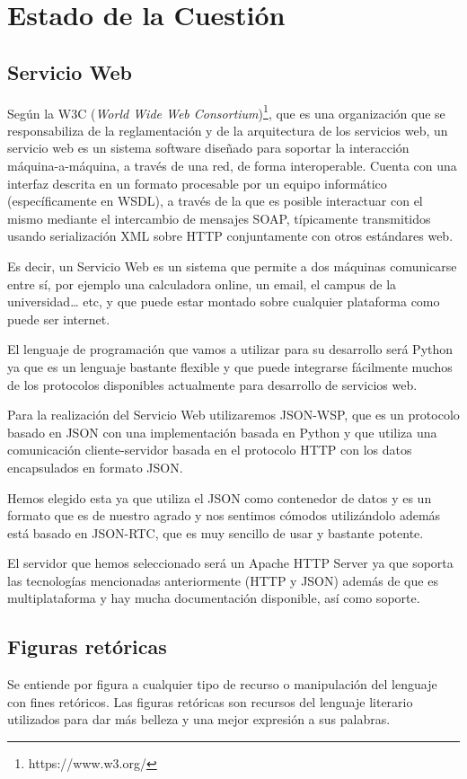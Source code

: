 \chapter{Estado de la Cuestión}
\label{cap:estadoDeLaCuestion}


\section{Servicio Web}
Según la W3C (\textit{World Wide Web Consortium})\footnote{https://www.w3.org/}, que es una organización que se responsabiliza de la reglamentación y de la arquitectura de los servicios web, un servicio web es un sistema software diseñado para soportar la interacción máquina-a-máquina, a través de una red, de forma interoperable.  Cuenta con una interfaz descrita en un formato procesable por un equipo informático (específicamente en WSDL), a través de la que es posible interactuar con el mismo mediante el intercambio de mensajes SOAP, típicamente transmitidos usando serialización XML sobre HTTP conjuntamente con otros estándares web.

Es decir, un Servicio Web es un sistema que permite a dos máquinas comunicarse entre sí, por ejemplo una calculadora online, un email, el campus de la universidad… etc, y que puede estar montado sobre cualquier plataforma como puede ser internet.

El lenguaje de programación que vamos a utilizar para su desarrollo será Python ya que es un lenguaje bastante flexible y que puede integrarse fácilmente muchos de los protocolos disponibles actualmente para desarrollo de servicios web.

Para la realización del Servicio Web utilizaremos JSON-WSP, que es un protocolo basado en JSON con una implementación basada en Python y que utiliza una comunicación cliente-servidor basada en el protocolo HTTP con los datos encapsulados en formato JSON.

Hemos elegido esta ya que utiliza el JSON como contenedor de datos y es un formato que es de nuestro agrado y nos sentimos cómodos utilizándolo además está basado en JSON-RTC, que es muy sencillo de usar y bastante potente.

El servidor que hemos seleccionado será un Apache HTTP Server ya que soporta las tecnologías mencionadas anteriormente (HTTP y JSON) además de que es multiplataforma y hay mucha documentación disponible, así como soporte.

\section{Figuras retóricas}
Se entiende por figura a cualquier tipo de recurso o manipulación del lenguaje con fines retóricos.
Las figuras retóricas son recursos del lenguaje literario utilizados para dar más belleza y una mejor expresión a sus palabras.

